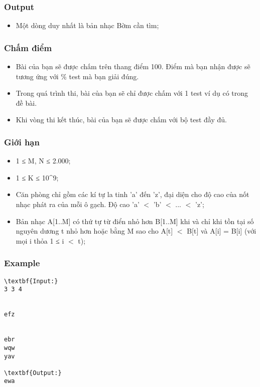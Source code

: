 \subsubsection{   Output  }
\begin{itemize}
	\item     Một dòng duy nhất là bản nhạc Bờm cần tìm;   
\end{itemize}

\subsubsection{   Chấm điểm  }
\begin{itemize}
	\item     Bài của bạn sẽ được chấm trên thang điểm 100. Điểm mà bạn nhận được sẽ tương ứng với \% test mà bạn giải đúng.   
	\item     Trong quá trình thi, bài của bạn sẽ chỉ được chấm với 1 test ví dụ có trong đề bài.   
	\item     Khi vòng thi kết thúc, bài của bạn sẽ được chấm với bộ test đầy đủ.   
\end{itemize}

\subsubsection{   Giới hạn  }
\begin{itemize}
	\item     1 ≤ M, N ≤ 2.000;   
	\item     1 ≤ K ≤ 10^9;   
	\item     Căn phòng chỉ gồm các kí tự la tinh 'a' đến 'z', đại diện cho độ cao của nốt nhạc phát ra của mỗi ô gạch. Độ cao 'a' $<$ 'b' $<$ ... $<$ 'z';   
	\item     Bản nhạc A[1..M] có thứ tự từ điển nhỏ hơn B[1..M] khi và chỉ khi tồn tại số nguyên dương t nhỏ hơn hoặc bằng M sao cho A[t] $<$ B[t] và A[i] = B[i] (với mọi i thỏa 1 ≤ i $<$ t);   
\end{itemize}
\begin{itemize}
\end{itemize}

\subsubsection{   Example  }
\begin{verbatim}
\textbf{Input:}
3 3 4


efz


ebr
wqw
yav

\textbf{Output:}
ewa
\end{verbatim}
